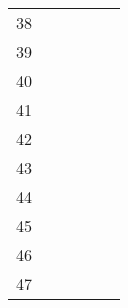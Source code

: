 \begin{table}[ht]
\begin{tabular}{c|lllll}
    38                       &                                          &                                           &                                                &                                    &                                      \\
    39                       &                                          &                                           &                                                &                                    &                                      \\
    40                       &                                          &                                           &                                                &                                    &                                      \\
    41                       &                                          &                                           &                                                &                                    &                                      \\
    42                       &                                          &                                           &                                                &                                    &                                      \\
    43                       &                                          &                                           &                                                &                                    &                                      \\
    44                       &                                          &                                           &                                                &                                    &                                      \\
    45                       &                                          &                                           &                                                &                                    &                                      \\
    46                       &                                          &                                           &                                                &                                    &                                      \\
    47                       &                                          &                                           &                                                &                                    &                                      \\

\end{tabular}
\end{table}
